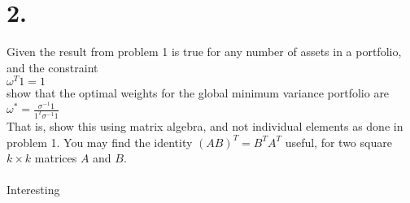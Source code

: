 \documentclass{article}
\begin{document}
\section*{2.}
{\Large

Given the result from problem 1 is true for any number of assets in a portfolio, and the constraint \\ 
$\omega^T1 = 1$ \\
show that the optimal weights for the global minimum variance portfolio are \\ 
$\omega^* = \frac{\sigma^{-1}1}{1^T\sigma^{-1}1}$ \\
That is, show this using matrix algebra, and not individual elements as done in problem 1. You may find the identity $(AB)^T = B^TA^T$ useful, for two square $k \times k$ matrices $A$ and $B$. \\ \\

Interesting


}
\end{document}
